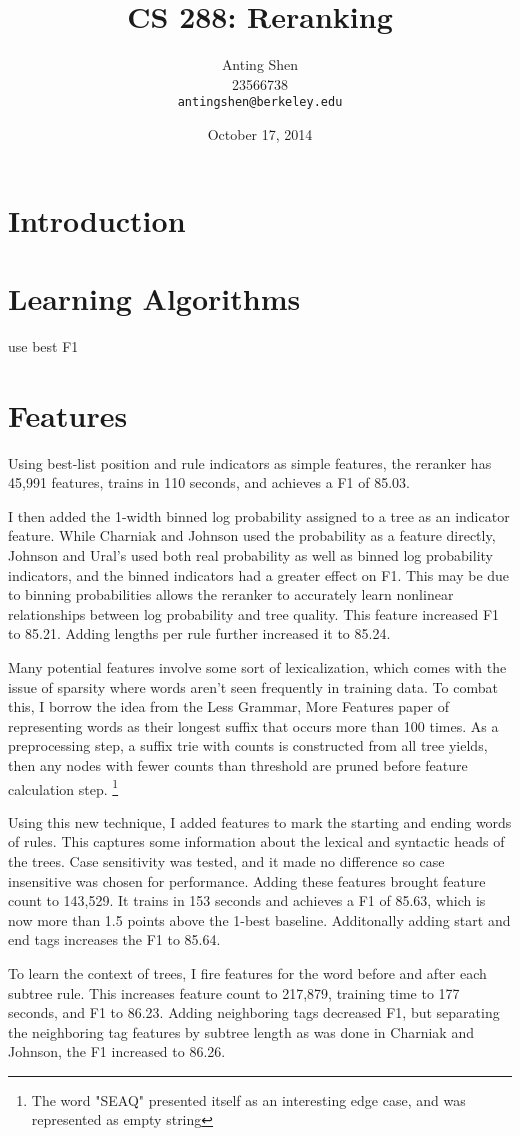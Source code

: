 \documentclass[11pt]{article}
\title{CS 288: Reranking}
\author{Anting Shen \\
  23566738 \\
  {\tt antingshen@berkeley.edu} \\
}
\date{October 17, 2014}
\begin{document}
\maketitle

\section{Introduction}


\section{Learning Algorithms}

use best F1


\section{Features}

Using best-list position and rule indicators as simple features, the reranker has 45,991 features,
trains in 110 seconds, and achieves a F1 of 85.03.

I then added the 1-width binned log probability assigned to a tree as an indicator feature.
While Charniak and Johnson used the probability as a feature directly,
Johnson and Ural's used both real probability as well as binned log probability indicators,
and the binned indicators had a greater effect on F1. This may be due to binning probabilities
allows the reranker to accurately learn nonlinear relationships between log probability and tree quality.
This feature increased F1 to 85.21. Adding lengths per rule further increased it to 85.24.

Many potential features involve some sort of lexicalization, which comes with the issue of sparsity
where words aren't seen frequently in training data. To combat this, I borrow the idea from the
Less Grammar, More Features paper of representing words as their longest suffix that occurs more
than 100 times. As a preprocessing step, a suffix trie with counts is constructed from
all tree yields, then any nodes with fewer counts than threshold are pruned before feature calculation step.
\footnote{The word "SEAQ" presented itself as an interesting edge case, and was represented
as empty string}

Using this new technique, I added features to mark the starting and ending words of rules.
This captures some information about the lexical and syntactic heads of the trees.
Case sensitivity was tested, and it made no difference so case insensitive was chosen for performance.
Adding these features brought feature count to 143,529. It trains in 153 seconds
and achieves a F1 of 85.63, which is now more than 1.5 points above the 1-best baseline.
Additonally adding start and end tags increases the F1 to 85.64.

To learn the context of trees, I fire features for the word before and after each subtree rule.
This increases feature count to 217,879, training time to 177 seconds, and F1 to 86.23.
Adding neighboring tags decreased F1, but separating the neighboring tag features by subtree
length as was done in Charniak and Johnson, the F1 increased to 86.26.
\end{document}

